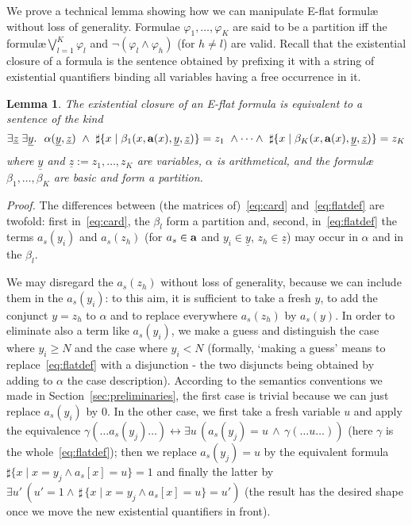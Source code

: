 \documentclass[11pt,a4paper]{article}
\newcommand{\formulae}{formul\ae\xspace}
\newcommand{\uy}{\ensuremath{\underline y}}
\newcommand{\uz}{\ensuremath{\underline z}}
\newcommand{\ta}{\ensuremath{{\bf a}}\xspace}
\newtheorem{lemma}{Lemma}
\begin{document}
  
  
  
  
We  prove a technical lemma showing how we can manipulate
E-flat \formulae without loss of generality.
Formulae 
$\varphi_1, \dots, \varphi_K$ are said to be a partition iff the \formulae $\bigvee_{l=1}^K \varphi_l$ and $\neg(\varphi_l\wedge \varphi_h)$ (for $h\neq l$)
are valid. Recall that the existential closure of a formula is the sentence obtained by prefixing it with a string of existential quantifiers binding all variables having a free occurrence in it.

\begin{lemma}\label{lemma:nf}
 The existential closure of an E-flat  formula  is equivalent to a sentence of the kind 
 \begin{equation}\label{eq:card}
\exists \uz\;\exists \uy.~~\alpha(\uy, \uz)~ \wedge~ \sharp\{x\mid \beta_1(x, \ta(x), \uy, \uz)\} =z_1~\wedge \cdots \wedge~ \sharp\{x\mid \beta_K(x, \ta(x),\uy, \uz )\} =z_K
\end{equation}
 where $\uy$ and $\uz:=z_1, \dots, z_K$ are  variables, $\alpha$ is arithmetical, and the \formulae $\beta_1, \dots, \beta_K$  are basic and form a partition.\end{lemma}

\noindent
\textit{Proof.} The differences between (the matrices of)~\eqref{eq:card} and~\eqref{eq:flatdef} are twofold: first in~\eqref{eq:card}, the $\beta_l$ form a partition and, second, in~\eqref{eq:flatdef} the terms $a_s(y_i)$ and $a_s(z_h)$ 
(for $a_s\in \ta$ and $y_i\in \uy$, $z_h\in \uz$) may occur in $\alpha$ 
and in the $\beta_l$.

We may disregard the $a_s(z_h)$ without loss of generality, because we can include them in the $a_s(y_i)$: to this aim, it is sufficient to take a fresh $y$, to add
the conjunct $y=z_h$ to $\alpha$ and to replace everywhere $a_s(z_h)$ by $a_s(y)$.
  In order 
to  eliminate also a term like $a_s(y_i)$, we make a guess and distinguish 
the case where $y_i\geq N$ and the case where $y_i < N$ (formally, `making a guess' means to replace~\eqref{eq:flatdef} with a disjunction - the two disjuncts being obtained by adding to $\alpha$ the case description). According to the semantics conventions we made in Section~\ref{sec:preliminaries}, the first case is trivial
because we can just replace $a_s(y_i)$ by 0. In the other case, we
first take  a fresh variable $u$ and apply  
 the equivalence
$\gamma(\dots a_s(y_j)\dots)\leftrightarrow \exists u\, (a_s(y_j)=u \,\wedge\, \gamma(\dots u\dots))$
(here $\gamma$ is the whole~\eqref{eq:flatdef});  then we replace $a_s(y_j)=u$ by the equivalent formula 
 $\sharp\{x \mid x=y_j \wedge a_s[x]=u\}=1$
and 
finally the latter by $\exists u'\, (u'=1 \wedge\, \sharp\,\{x \mid x=y_j \wedge a_s[x]=u\}=u')$ 
 (the result has the desired shape once we move the new existential  quantifiers in front).
 
\end{document}
